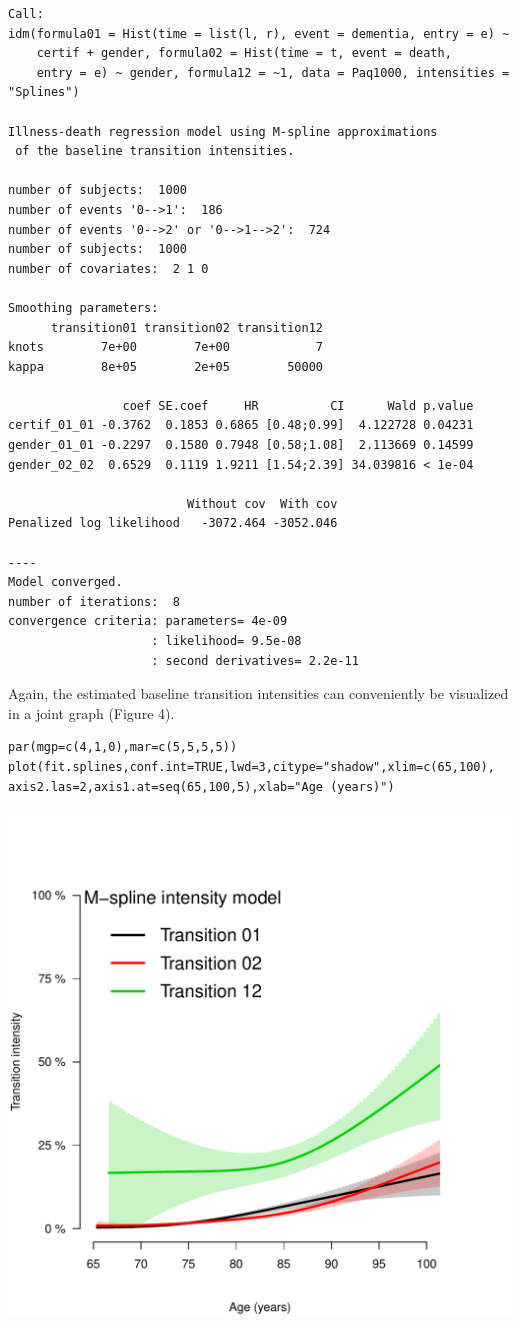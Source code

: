 \documentclass{article}
\begin{document}
\begin{verbatim}
Call:
idm(formula01 = Hist(time = list(l, r), event = dementia, entry = e) ~ 
    certif + gender, formula02 = Hist(time = t, event = death, 
    entry = e) ~ gender, formula12 = ~1, data = Paq1000, intensities = "Splines")

Illness-death regression model using M-spline approximations
 of the baseline transition intensities.

number of subjects:  1000 
number of events '0-->1':  186 
number of events '0-->2' or '0-->1-->2':  724 
number of subjects:  1000 
number of covariates:  2 1 0 

Smoothing parameters:
      transition01 transition02 transition12
knots        7e+00        7e+00            7
kappa        8e+05        2e+05        50000

                coef SE.coef     HR          CI      Wald p.value
certif_01_01 -0.3762  0.1853 0.6865 [0.48;0.99]  4.122728 0.04231
gender_01_01 -0.2297  0.1580 0.7948 [0.58;1.08]  2.113669 0.14599
gender_02_02  0.6529  0.1119 1.9211 [1.54;2.39] 34.039816 < 1e-04

                         Without cov  With cov
Penalized log likelihood   -3072.464 -3052.046

----
Model converged.
number of iterations:  8 
convergence criteria: parameters= 4e-09 
                    : likelihood= 9.5e-08 
                    : second derivatives= 2.2e-11
\end{verbatim}

Again, the estimated baseline transition intensities can conveniently
be visualized in a joint graph (Figure 4).

\lstset{basicstyle=\small\tt,numbers=left,language=R,label=paq-fit-splines}
\begin{lstlisting}
par(mgp=c(4,1,0),mar=c(5,5,5,5))
plot(fit.splines,conf.int=TRUE,lwd=3,citype="shadow",xlim=c(65,100), axis2.las=2,axis1.at=seq(65,100,5),xlab="Age (years)")
\end{lstlisting}

\includegraphics[width=.9\linewidth]{transition-intensities-paq-splines.pdf}
\end{document}
